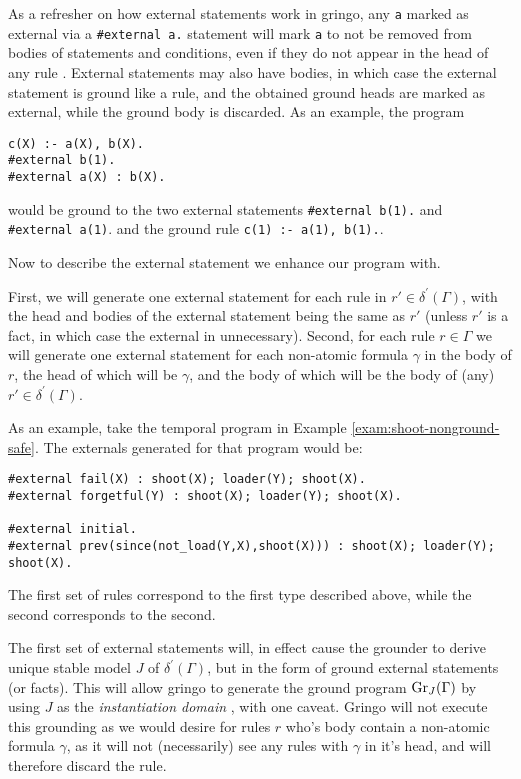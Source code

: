 As a refresher on how external statements work in gringo, any \verb|a|
marked as external via a \verb|#external a.| statement will mark
\verb|a| to not be removed from bodies of statements and conditions,
even if they do not appear in the head of any rule
\cite{PotasscoUserGuide19}. External statements may also have bodies,
in which case the external statement is ground like a rule, and the
obtained ground heads are marked as external, while the ground body is
discarded. As an example, the program
\begin{lstlisting}[language=clingo]
c(X) :- a(X), b(X).
#external b(1).
#external a(X) : b(X).
\end{lstlisting}
would be ground to the two external statements \verb|#external b(1).|
and \\\verb|#external a(1)|. and the ground rule
\verb|c(1) :- a(1), b(1).|.

Now to describe the external statement we enhance our program
with. 

First, we will generate one external statement for each rule in
$r' \in \delta^\prime(\Gamma)$, with the head and bodies of the
external statement being the same as $r'$ (unless $r'$ is a fact, in
which case the external in unnecessary). Second, for each rule
$r \in \Gamma$ we will generate one external statement for each
non-atomic formula $\gamma$ in the body of $r$, the head of which will
be $\gamma$, and the body of which will be the body of (any)
$r' \in \delta^\prime(\Gamma)$.


\begin{example}
  As an example, take the temporal program in Example
  \ref{exam:shoot-nonground-safe}. The externals generated for that program would be:
\begin{lstlisting}[numbers=none]
#external fail(X) : shoot(X); loader(Y); shoot(X).
#external forgetful(Y) : shoot(X); loader(Y); shoot(X).

#external initial.
#external prev(since(not_load(Y,X),shoot(X))) : shoot(X); loader(Y); shoot(X).
  \end{lstlisting}
  The first set of rules correspond to the first type described above,
  while the second corresponds to the second.
\end{example}

The first set of external statements will, in effect cause the
grounder to derive unique stable model $J$ of $\delta^\prime(\Gamma)$,
but in the form of ground external statements (or facts). This will
allow gringo to generate the ground program $\operatorname{Gr}_{J}(\Gamma)$ by
using $J$ as the \emph{instantiation domain}
\cite[p. 82]{gekakasc12a}, with one caveat. Gringo will not execute
this grounding as we would desire for rules $r$ who's body contain a
non-atomic formula $\gamma$, as it will not (necessarily) see any
rules with $\gamma$ in it's head, and will therefore discard the rule.


